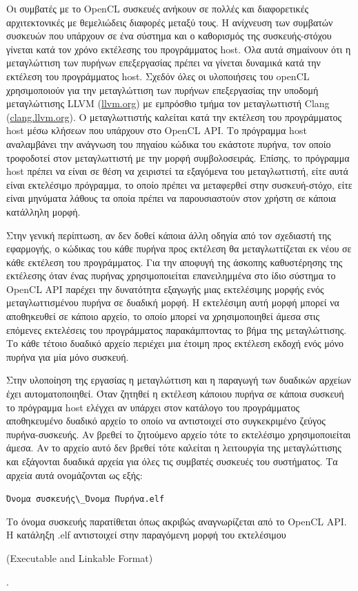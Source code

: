 Οι συμβατές με το OpenCL συσκευές ανήκουν σε πολλές και διαφορετικές αρχιτεκτονικές με θεμελιώδεις διαφορές μεταξύ τους. Η ανίχνευση των συμβατών συσκευών που υπάρχουν σε ένα σύστημα και ο καθορισμός της συσκευής-στόχου γίνεται κατά τον χρόνο εκτέλεσης του προγράμματος host. Όλα αυτά σημαίνουν ότι η μεταγλώττιση των πυρήνων επεξεργασίας πρέπει να γίνεται δυναμικά κατά  την εκτέλεση του προγράμματος host. 
Σχεδόν όλες οι υλοποιήσεις του openCL χρησιμοποιούν για την μεταγλώττιση των πυρήνων επεξεργασίας την υποδομή μεταγλώττισης LLVM (\url{llvm.org}) με εμπρόσθιο τμήμα τον μεταγλωττιστή Clang (\url{clang.llvm.org}). Ο μεταγλωττιστής καλείται κατά την εκτέλεση του προγράμματος host  μέσω κλήσεων που υπάρχουν στο OpenCL API. Το πρόγραμμα host αναλαμβάνει την ανάγνωση του πηγαίου κώδικα του εκάστοτε πυρήνα, τον οποίο τροφοδοτεί στον μεταγλωττιστή με την μορφή συμβολοσειράς. Επίσης, το πρόγραμμα host πρέπει να είναι σε θέση να χειριστεί τα εξαγόμενα του μεταγλωττιστή, είτε αυτά είναι εκτελέσιμο πρόγραμμα, το οποίο πρέπει να μεταφερθεί στην συσκευή-στόχο, είτε είναι μηνύματα λάθους τα οποία πρέπει να παρουσιαστούν στον χρήστη σε κάποια κατάλληλη μορφή.

Στην γενική περίπτωση, αν δεν δοθεί κάποια άλλη οδηγία από τον σχεδιαστή της εφαρμογής, ο κώδικας του κάθε πυρήνα προς εκτέλεση θα μεταγλωττίζεται εκ νέου σε κάθε εκτέλεση του προγράμματος. Για την αποφυγή της άσκοπης καθυστέρησης της εκτέλεσης όταν ένας πυρήνας χρησιμοποιείται επανειλημμένα στο ίδιο σύστημα το OpenCL API παρέχει την δυνατότητα εξαγωγής μιας εκτελέσιμης μορφής ενός μεταγλωττισμένου πυρήνα σε δυαδική μορφή. Η εκτελέσιμη αυτή μορφή μπορεί να αποθηκευθεί σε κάποιο αρχείο, το οποίο μπορεί να χρησιμοποιηθεί άμεσα στις επόμενες εκτελέσεις του προγράμματος παρακάμπτοντας το βήμα της μεταγλώττισης. Το κάθε τέτοιο δυαδικό αρχείο περιέχει μια έτοιμη προς εκτέλεση εκδοχή ενός μόνο πυρήνα για μία μόνο συσκευή.

Στην υλοποίηση της εργασίας η μεταγλώττιση και η παραγωγή των δυαδικών αρχείων έχει αυτοματοποιηθεί. Όταν ζητηθεί η εκτέλεση κάποιου πυρήνα σε κάποια συσκευή το πρόγραμμα host ελέγχει αν υπάρχει στον κατάλογο του προγράμματος αποθηκευμένο δυαδικό αρχείο το οποίο να αντιστοιχεί στο συγκεκριμένο ζεύγος πυρήνα-συσκευής. Αν βρεθεί το ζητούμενο αρχείο τότε το εκτελέσιμο χρησιμοποιείται άμεσα. Αν το αρχείο αυτό δεν βρεθεί τότε καλείται η λειτουργία της μεταγλώττισης και εξάγονται δυαδικά αρχεία για όλες τις συμβατές συσκευές του συστήματος. Τα αρχεία αυτά ονομάζονται ως εξής:
\begin{center}
\verb!Όνομα συσκευής\_Όνομα Πυρήνα.elf!
\end{center}
Το όνομα συσκευής παρατίθεται όπως ακριβώς αναγνωρίζεται από το OpenCL API. H κατάληξη .elf αντιστοιχεί στην παραγόμενη μορφή του εκτελέσιμου \begin{english}(Executable and Linkable Format)\end{english}. 

